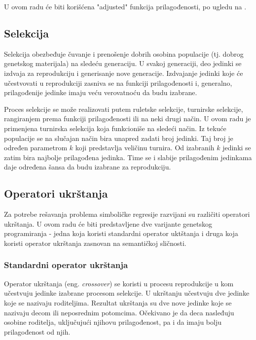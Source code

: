 \documentclass[main.tex]{subfiles}
\begin{document}
U ovom radu će biti korišćena "adjusted" funkcija prilagođenosti, po ugledu na \cite{koza}.



\subsection{Selekcija}
\label{sec:selection}

Selekcija obezbeđuje čuvanje i prenošenje dobrih osobina populacije (tj. dobrog genetskog materijala) na sledeću generaciju. U svakoj generaciji, deo jedinki se izdvaja za reprodukciju i generisanje nove generacije. Izdvajanje jedinki koje će učestvovati u reprodukciji zasniva se na funkciji prilagođenosti i, generalno, prilagođenije jedinke imaju veću verovatnoću da budu izabrane. 

Proces selekcije se može realizovati putem ruletske selekcije, turnirske selekcije, rangiranjem prema funkciji prilagođenosti ili na neki drugi način. U ovom radu je primenjena turnirska selekcija koja funkcioniše na sledeći način. Iz tekuće populacije se na slučajan način bira unapred zadati broj jedinki. Taj broj je određen parametrom $k$ koji predstavlja veličinu turnira. Od izabranih $k$ jedinki se zatim bira najbolje prilagođena jedinka. Time se i slabije prilagođenim jedinkama daje određena šansa da budu izabrane za reprodukciju.

\subsection{Operatori ukrštanja}
\label{sec:crossover}

Za potrebe rešavanja problema simboličke regresije razvijani su različiti operatori ukrštanja. %
U ovom radu će biti predstavljene dve varijante genetskog programiranja - jedna koja koristi standardni operator uktštanja i druga koja koristi operator ukrštanja zasnovan na semantičkoj sličnosti.

\subsubsection{Standardni operator ukrštanja}
\label{sec:stdCrossover}

Operator ukrštanja (eng. \textit{crossover}) se koristi u procesu reprodukcije u kom učestvuju jedinke izabrane procesom selekcije. U ukrštanju učestvuju dve jedinke koje se nazivaju roditeljima. Rezultat ukrštanja su dve nove jedinke koje se nazivaju decom ili neposrednim potomcima. Očekivano je da deca nasleđuju osobine roditelja, uključujući njihovu prilagođenost, pa i da imaju bolju prilagođenost od njih.
\end{document}
